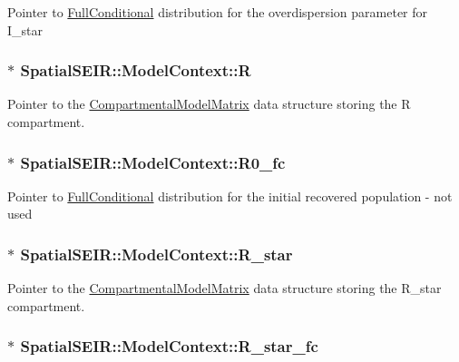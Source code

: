 Pointer to \hyperlink{classSpatialSEIR_1_1FullConditional}{Full\-Conditional} distribution for the overdispersion parameter for I\-\_\-star \hypertarget{classSpatialSEIR_1_1ModelContext_a97ad90554c0f23cc4137661285df3213}{
\subsubsection[{R}]{$\ast$ Spatial\-S\-E\-I\-R\-::\-Model\-Context\-::\-R}}\label{classSpatialSEIR_1_1ModelContext_a97ad90554c0f23cc4137661285df3213}
Pointer to the \hyperlink{classSpatialSEIR_1_1CompartmentalModelMatrix}{Compartmental\-Model\-Matrix} data structure storing the R compartment. \hypertarget{classSpatialSEIR_1_1ModelContext_a080fbc05c16a279300a4b1f7957592f8}{
\subsubsection[{R0\-\_\-fc}]{$\ast$ Spatial\-S\-E\-I\-R\-::\-Model\-Context\-::\-R0\-\_\-fc}}\label{classSpatialSEIR_1_1ModelContext_a080fbc05c16a279300a4b1f7957592f8}
Pointer to \hyperlink{classSpatialSEIR_1_1FullConditional}{Full\-Conditional} distribution for the initial recovered population -\/ not used \hypertarget{classSpatialSEIR_1_1ModelContext_a03a86c851b58cf707ed0e0f734f01780}{
\subsubsection[{R\-\_\-star}]{$\ast$ Spatial\-S\-E\-I\-R\-::\-Model\-Context\-::\-R\-\_\-star}}\label{classSpatialSEIR_1_1ModelContext_a03a86c851b58cf707ed0e0f734f01780}
Pointer to the \hyperlink{classSpatialSEIR_1_1CompartmentalModelMatrix}{Compartmental\-Model\-Matrix} data structure storing the R\-\_\-star compartment. \hypertarget{classSpatialSEIR_1_1ModelContext_a0f77d6658696a3c2fa584caa036135a5}{
\subsubsection[{R\-\_\-star\-\_\-fc}]{$\ast$ Spatial\-S\-E\-I\-R\-::\-Model\-Context\-::\-R\-\_\-star\-\_\-fc}}\label{classSpatialSEIR_1_1ModelContext_a0f77d6658696a3c2fa584caa036135a5}
